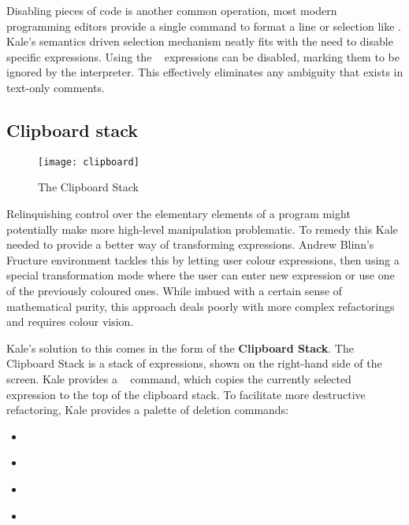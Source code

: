Disabling pieces of code is another common operation, most modern programming
editors provide a single command to format a line or selection like
\keys{\ctrl + /}. Kale's semantics driven selection mechanism neatly fits with
the need to disable specific expressions. Using the
\hyperref[cmd:disable]{}~\keys{\textbackslash} expressions can be
disabled, marking them to be ignored by the interpreter. This effectively
eliminates any ambiguity that exists in text-only comments.

\needspace{7cm}
\subsection{Clipboard stack}
\label{soln:clipboard_list}
\begin{wrapfigure}[15]{R}{0.pt}
	\texttt{[image: clipboard]}
	\caption{The Clipboard Stack}
\end{wrapfigure}

Relinquishing control over the elementary elements of a program might
potentially make more high-level manipulation problematic. To remedy this
Kale needed to provide a better way of transforming expressions. Andrew Blinn's
Fructure \cite{Fructure} environment tackles this by letting user colour
expressions, then
using a special transformation mode where the user can enter new expression or
use one of the previously coloured ones. While imbued with a certain sense of
mathematical purity, this approach deals poorly with more complex refactorings
and requires colour vision.

Kale's solution to this comes in the form of the \textbf{Clipboard Stack}. The
Clipboard Stack is a stack of expressions, shown on the right-hand side of the
screen. Kale provides a \hyperref[cmd:copy]{}~ command, which
copies the currently
selected expression to the top of the clipboard stack. To facilitate more
destructive refactoring, Kale provides a palette of deletion commands:

\begin{itemize}[noitemsep]
	\item \hyperref[cmd:delete]{} \keys{\backspace}
	\item \hyperref[cmd:cut]{} 
	\item \hyperref[cmd:delete_blank]{} 
	\item \hyperref[cmd:cut_blank]{} 
\end{itemize}

